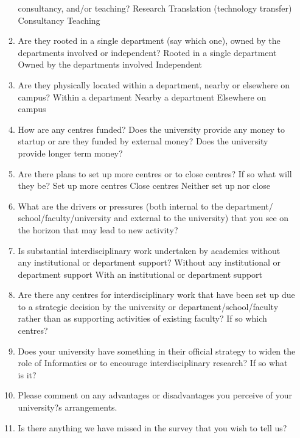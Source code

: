 \begin{enumerate}
\begin{enumerate}
consultancy, and/or teaching?
Research
Translation (technology transfer)
Consultancy
Teaching
\item Are they rooted in a single department (say which one), owned by
the departments involved or independent?
Rooted in a single department
Owned by the departments involved
Independent
\item Are they physically located within a department, nearby or
elsewhere on campus?
Within a department
Nearby a department
Elsewhere on campus
\item How are any centres funded? Does the university provide any
money to startup or are they funded by external money? Does the
university provide longer term money?
\item Are there plans to set up more centres or to close centres? If so
what will they be?
Set up more centres
Close centres
Neither set up nor close
\item What are the drivers or pressures (both internal to the department/
school/faculty/university and external to the university)
that you see on the horizon that may lead to new activity?
\item Is substantial interdisciplinary work undertaken by academics
without any institutional or department support?
Without any institutional or department support
With an institutional or department support
\item Are there any centres for interdisciplinary work that have been set
up due to a strategic decision by the university or
department/school/faculty rather than as supporting activities of
existing faculty? If so which centres?
\item Does your university have something in their official strategy to
widen the role of Informatics or to encourage interdisciplinary
research? If so what is it?
\item Please comment on any advantages or disadvantages you perceive of your university?s arrangements.
\item Is there anything we have missed in the survey that you wish to tell us?
\end{enumerate}
\end{enumerate}